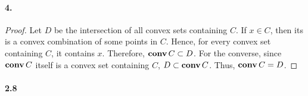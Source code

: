   \paragraph{4.}
  \begin{proof}
    Let $D$ be the intersection of all convex sets containing $C$. If $x\in C$,
    then its is a convex combination of some points in $C$. Hence, for every 
    convex set containing $C$, it contains $x$. Therefore, $\operatorname{\mathbf{conv}} C\subset D$.
    For the converse, since $\operatorname{\mathbf{conv}} C$ itself is a convex set containing $C$, $D
    \subset\operatorname{\mathbf{conv}} C$. Thus, $\operatorname{\mathbf{conv}} C=D$.
  \end{proof}



\iffalse
\paragraph{2.8}
